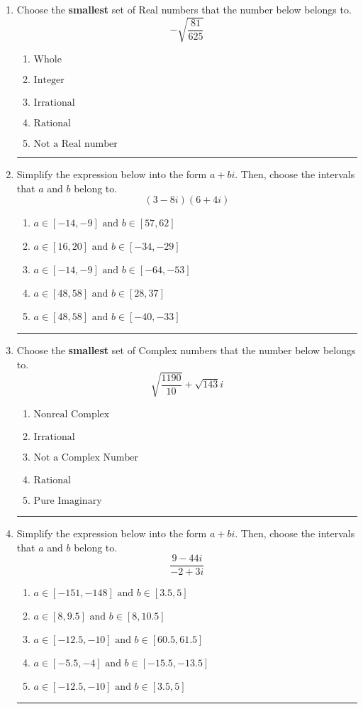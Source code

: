 \documentclass[14pt]{extbook}
\newcommand{\litem}[1]{\item#1\hspace*{-1cm}\rule{\textwidth}{0.4pt}}
\begin{document}
\begin{enumerate}
\litem{
Choose the \textbf{smallest} set of Real numbers that the number below belongs to.\[ -\sqrt{\frac{81}{625}} \]\begin{enumerate}[label=\Alph*.]
\item \( \text{Whole} \)
\item \( \text{Integer} \)
\item \( \text{Irrational} \)
\item \( \text{Rational} \)
\item \( \text{Not a Real number} \)

\end{enumerate} }
\litem{
Simplify the expression below into the form $a+bi$. Then, choose the intervals that $a$ and $b$ belong to.\[ (3 - 8 i)(6 + 4 i) \]\begin{enumerate}[label=\Alph*.]
\item \( a \in [-14, -9] \text{ and } b \in [57, 62] \)
\item \( a \in [16, 20] \text{ and } b \in [-34, -29] \)
\item \( a \in [-14, -9] \text{ and } b \in [-64, -53] \)
\item \( a \in [48, 58] \text{ and } b \in [28, 37] \)
\item \( a \in [48, 58] \text{ and } b \in [-40, -33] \)

\end{enumerate} }
\litem{
Choose the \textbf{smallest} set of Complex numbers that the number below belongs to.\[ \sqrt{\frac{1190}{10}}+\sqrt{143} i \]\begin{enumerate}[label=\Alph*.]
\item \( \text{Nonreal Complex} \)
\item \( \text{Irrational} \)
\item \( \text{Not a Complex Number} \)
\item \( \text{Rational} \)
\item \( \text{Pure Imaginary} \)

\end{enumerate} }
\litem{
Simplify the expression below into the form $a+bi$. Then, choose the intervals that $a$ and $b$ belong to.\[ \frac{9 - 44 i}{-2 + 3 i} \]\begin{enumerate}[label=\Alph*.]
\item \( a \in [-151, -148] \text{ and } b \in [3.5, 5] \)
\item \( a \in [8, 9.5] \text{ and } b \in [8, 10.5] \)
\item \( a \in [-12.5, -10] \text{ and } b \in [60.5, 61.5] \)
\item \( a \in [-5.5, -4] \text{ and } b \in [-15.5, -13.5] \)
\item \( a \in [-12.5, -10] \text{ and } b \in [3.5, 5] \)


\end{enumerate}}
\end{enumerate}
\end{document}
